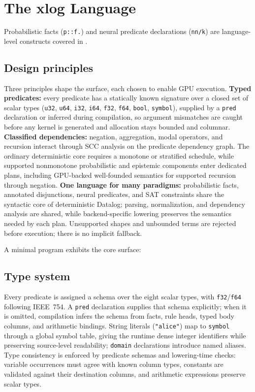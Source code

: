 \section{The xlog Language}\label{sec:lang}

Probabilistic facts (\texttt{p::f.}) and neural predicate declarations (\texttt{nn/k}) are language-level constructs covered in .

\subsection{Design principles}

Three principles shape the surface, each chosen to enable GPU execution. \textbf{Typed predicates:} every predicate has a statically known signature over a closed set of scalar types (\texttt{u32}, \texttt{u64}, \texttt{i32}, \texttt{i64}, \texttt{f32}, \texttt{f64}, \texttt{bool}, \texttt{symbol}), supplied by a \texttt{pred} declaration or inferred during compilation, so argument mismatches are caught before any kernel is generated and allocation stays bounded and columnar. \textbf{Classified dependencies:} negation, aggregation, modal operators, and recursion interact through SCC analysis on the predicate dependency graph. The ordinary deterministic core requires a monotone or stratified schedule, while supported nonmonotone probabilistic and epistemic components enter dedicated plans, including GPU-backed well-founded semantics for supported recursion through negation. \textbf{One language for many paradigms:} probabilistic facts, annotated disjunctions, neural predicates, and SAT constraints share the syntactic core of deterministic Datalog; parsing, normalization, and dependency analysis are shared, while backend-specific lowering preserves the semantics needed by each plan. Unsupported shapes and unbounded terms are rejected before execution; there is no implicit fallback.

A minimal program exhibits the core surface:



\subsection{Type system}\label{sec:lang:types}

Every predicate is assigned a schema over the eight scalar types, with \texttt{f32}/\texttt{f64} following IEEE~754. A \texttt{pred} declaration supplies that schema explicitly; when it is omitted, compilation infers the schema from facts, rule heads, typed body columns, and arithmetic bindings. String literals (\texttt{"alice"}) map to \texttt{symbol} through a global symbol table, giving the runtime dense integer identifiers while preserving source-level readability; \texttt{domain} declarations introduce named aliases. Type consistency is enforced by predicate schemas and lowering-time checks: variable occurrences must agree with known column types, constants are validated against their destination columns, and arithmetic expressions preserve scalar types.

